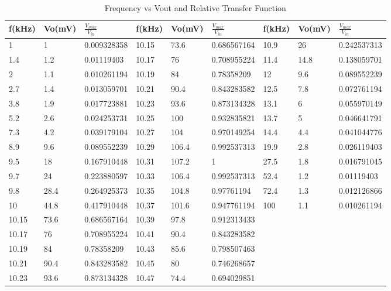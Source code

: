 \documentclass{article}
\begin{document}
    \begin{table}[h]
    \centering
    \caption{Frequency vs Vout and Relative Transfer Function}
    \label{my-label}
    \begin{tabular}{lllllllll}
    \hline
    \textbf{f(kHz)} & \textbf{Vo(mV)} & \textbf{$\frac{V_{max}}{V_{in}}$} & \textbf{f(kHz)} & \textbf{Vo(mV)} & \textbf{$\frac{V_{max}}{V_{in}}$} & \textbf{f(kHz)} & \textbf{Vo(mV)} & \textbf{$\frac{V_{max}}{V_{in}}$} \\ \hline
    1 & 1 & 0.009328358 & 10.15 & 73.6 & 0.686567164 & 10.9 & 26 & 0.242537313 \\
    1.4 & 1.2 & 0.01119403 & 10.17 & 76 & 0.708955224 & 11.4 & 14.8 & 0.138059701 \\
    2 & 1.1 & 0.010261194 & 10.19 & 84 & 0.78358209 & 12 & 9.6 & 0.089552239 \\
    2.7 & 1.4 & 0.013059701 & 10.21 & 90.4 & 0.843283582 & 12.5 & 7.8 & 0.072761194 \\
    3.8 & 1.9 & 0.017723881 & 10.23 & 93.6 & 0.873134328 & 13.1 & 6 & 0.055970149 \\
    5.2 & 2.6 & 0.024253731 & 10.25 & 100 & 0.932835821 & 13.7 & 5 & 0.046641791 \\
    7.3 & 4.2 & 0.039179104 & 10.27 & 104 & 0.970149254 & 14.4 & 4.4 & 0.041044776 \\
    8.9 & 9.6 & 0.089552239 & 10.29 & 106.4 & 0.992537313 & 19.9 & 2.8 & 0.026119403 \\
    9.5 & 18 & 0.167910448 & 10.31 & 107.2 & 1 & 27.5 & 1.8 & 0.016791045 \\
    9.7 & 24 & 0.223880597 & 10.33 & 106.4 & 0.992537313 & 52.4 & 1.2 & 0.01119403 \\
    9.8 & 28.4 & 0.264925373 & 10.35 & 104.8 & 0.97761194 & 72.4 & 1.3 & 0.012126866 \\
    10 & 44.8 & 0.417910448 & 10.37 & 101.6 & 0.947761194 & 100 & 1.1 & 0.010261194 \\
    10.15 & 73.6 & 0.686567164 & 10.39 & 97.8 & 0.912313433 &  &  &  \\
    10.17 & 76 & 0.708955224 & 10.41 & 90.4 & 0.843283582 &  &  &  \\
    10.19 & 84 & 0.78358209 & 10.43 & 85.6 & 0.798507463 &  &  &  \\
    10.21 & 90.4 & 0.843283582 & 10.45 & 80 & 0.746268657 &  &  &  \\
    10.23 & 93.6 & 0.873134328 & 10.47 & 74.4 & 0.694029851 &  &  &  \\ \hline
    \end{tabular}
    \end{table}
\end{document}
